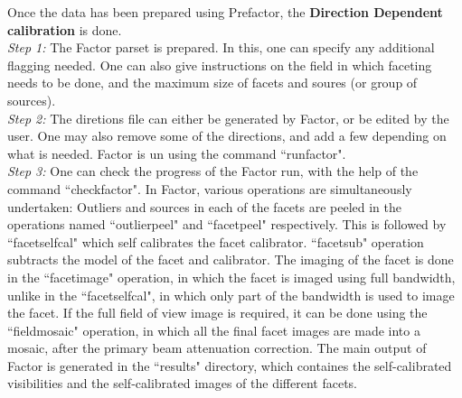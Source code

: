 \documentclass[../main/thesis_msc.tex]{subfiles}
\begin{document}
\noindent Once the data has been prepared using Prefactor, the \textbf{Direction Dependent calibration} is done. \\
\textit{Step 1: }The Factor parset is prepared. In this, one can specify any additional flagging needed. One can also give instructions on the field in which faceting needs to be done, and the maximum size of facets and soures (or group of sources).  \\
\textit{Step 2:} The diretions file can either be generated by Factor, or be edited by the user. One may also remove some of the directions, and add a few depending on what is needed. Factor is un using the command ``runfactor". \\
\textit{Step 3:} One can check the progress of the Factor run, with the help of the command ``checkfactor". In Factor, various operations are simultaneously undertaken: Outliers and sources in each of the facets are peeled in the operations named ``outlierpeel" and ``facetpeel" respectively. This is followed by ``facetselfcal" which self calibrates the facet calibrator. ``facetsub" operation subtracts the model of the facet and calibrator. The imaging of the facet is done in the ``facetimage" operation, in which the facet is imaged using full bandwidth, unlike in the ``facetselfcal", in which only part of the bandwidth is used to image the facet. If the full field of view image is required, it can be done using the ``fieldmosaic" operation, in which all the final facet images are made into a mosaic, after the primary beam attenuation correction. The main output of Factor is generated in the ``results" directory, which containes the self-calibrated visibilities and the self-calibrated images of the different facets. 
\end{document}
